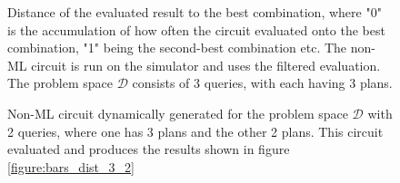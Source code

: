 \begin{figure}[!h]
    \centering
    \scalebox{\resultboxplot}{
        
    }
    \caption{Distance of the evaluated result to the best combination, where "0" is the accumulation of how often the circuit evaluated onto the best combination, "1" being the second-best combination etc. The non-ML circuit is run on the simulator and uses the filtered evaluation. The problem space $\mathcal{D}$ consists of 3 queries, with each having 3 plans.}
    \label{figure:bars_dist_3_3_3}
\end{figure}

\begin{figure}
    \centering
    \caption{Non-ML circuit dynamically generated for the problem space $\mathcal{D}$ with 2 queries, where one has 3 plans and the other 2 plans. This circuit evaluated and produces the results shown in figure \ref{figure:bars_dist_3_2}}
    \label{circuit:noml_dyn_problem}
\end{figure}

\newpage